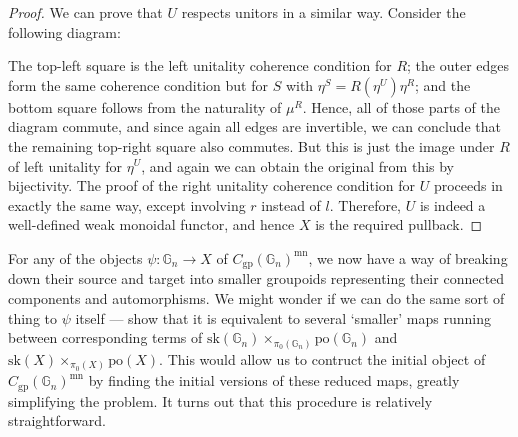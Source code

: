 \documentclass{amsart} %
\newenvironment{eq*}{\begin{equation*}}{\end{equation*}}
\begin{document}
\begin{proof}
We can prove that $U$ respects unitors in a similar way. Consider the following diagram:
\begin{eq*} 
\end{eq*}
The top-left square is the left unitality coherence condition for $R$; the outer edges form the same coherence condition but for $S$ with $\eta^S = R(\eta^U) \eta^R$; and the bottom square follows from the naturality of $\mu^R$. Hence, all of those parts of the diagram commute, and since again all edges are invertible, we can conclude that the remaining top-right square also commutes. But this is just the image under $R$ of left unitality for $\eta^U$, and again we can obtain the original from this by bijectivity. The proof of the right unitality coherence condition for $U$ proceeds in exactly the same way, except involving $r$ instead of $l$. Therefore, $U$ is indeed a well-defined weak monoidal functor, and hence $X$ is the required pullback.
\end{proof}

For any of the objects $\psi : \mathbb{G}_n \to X$ of $C_{\mathrm{gp}}(\mathbb{G}_n)^{\mathrm{mn}}$, we now have a way of breaking down their source and target into smaller groupoids representing their connected components and automorphisms. We might wonder if we can do the same sort of thing to $\psi$ itself --- show that it is equivalent to several `smaller' maps running between corresponding terms of $\mathrm{sk}(\mathbb{G}_n) \times_{\pi_0(\mathbb{G}_n)} \mathrm{po}(\mathbb{G}_n)$ and $\mathrm{sk}(X) \times_{\pi_0(X)} \mathrm{po}(X)$. This would allow us to contruct the initial object of $C_{\mathrm{gp}}(\mathbb{G}_n)^{\mathrm{mn}}$ by finding the initial versions of these reduced maps, greatly simplifying the problem. It turns out that this procedure is relatively straightforward.
\end{document}
